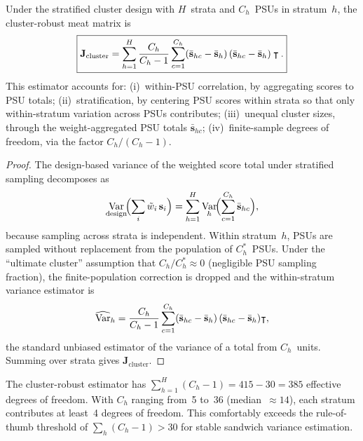 \begin{proposition}
\label{smc:prop-cluster-robust}
  Under the stratified cluster design with $H$~strata and
  $C_h$~PSUs in stratum~$h$, the cluster-robust meat matrix is
  \begin{equation}\label{smc:eq-J-cluster}
    \boxed{%
      \mathbf{J}_{\mathrm{cluster}}
      = \sum_{h=1}^{H}\frac{C_h}{C_h-1}
        \sum_{c=1}^{C_h}
        (\bar{\mathbf{s}}_{hc} - \bar{\mathbf{s}}_h)\,
        (\bar{\mathbf{s}}_{hc} - \bar{\mathbf{s}}_h)\t.
    }
  \end{equation}
  This estimator accounts for\textup{:}
  \textup{(i)}~within-PSU correlation, by aggregating scores to PSU
  totals\textup{;}
  \textup{(ii)}~stratification, by centering PSU scores within strata
  so that only within-stratum variation across PSUs contributes\textup{;}
  \textup{(iii)}~unequal cluster sizes, through the weight-aggregated
  PSU totals $\bar{\mathbf{s}}_{hc}$\textup{;}
  \textup{(iv)}~finite-sample degrees of freedom, via the factor
  $C_h/(C_h-1)$.
\end{proposition}

\begin{proof}
  The design-based variance of the weighted score total under
  stratified sampling decomposes as
  \[
    \operatorname*{Var}_{\textup{design}}\!\Bigl(\sum_i\tilde{w}_i\,\mathbf{s}_i\Bigr)
    = \sum_{h=1}^{H}
      \operatorname*{Var}_h\!\Bigl(\sum_{c=1}^{C_h}\bar{\mathbf{s}}_{hc}\Bigr),
  \]
  because sampling across strata is independent.  Within stratum~$h$,
  PSUs are sampled without replacement from the population of
  $C_h^{\ast}$~PSUs.  Under the ``ultimate cluster'' assumption that
  $C_h / C_h^{\ast} \approx 0$ (negligible PSU sampling fraction),
  the finite-population correction is dropped and the within-stratum
  variance estimator is
  \[
    \widehat{\operatorname*{Var}}_h
    = \frac{C_h}{C_h-1}
      \sum_{c=1}^{C_h}
      (\bar{\mathbf{s}}_{hc}-\bar{\mathbf{s}}_h)\,
      (\bar{\mathbf{s}}_{hc}-\bar{\mathbf{s}}_h)\intercal,
  \]
  the standard unbiased estimator of the variance of a total from
  $C_h$~units.  Summing over strata gives
  $\mathbf{J}_{\mathrm{cluster}}$.
\end{proof}

\begin{remark}
\label{smc:rem-dof}
  The cluster-robust estimator has
  $\sum_{h=1}^{H}(C_h - 1) = 415 - 30 = 385$ effective degrees of
  freedom.  With $C_h$ ranging from~5 to~36 (median~$\approx 14$), each
  stratum contributes at least~4 degrees of freedom.  This comfortably
  exceeds the rule-of-thumb threshold of $\sum_h(C_h - 1) > 30$ for
  stable sandwich variance estimation.
\end{remark}

